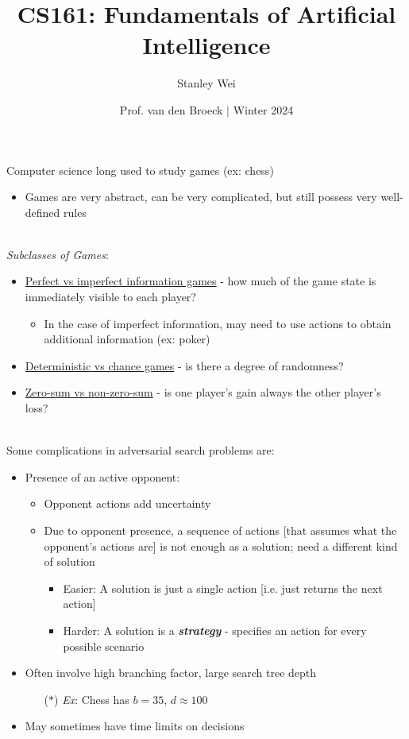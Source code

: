 \documentclass[12pt]{extarticle}
\title{CS161: Fundamentals of Artificial Intelligence}
\author{Stanley Wei}
\date{Prof. van den Broeck $\vert$ Winter 2024}
\theoremstyle{definition}
\theoremstyle{remark}
\newcommand{\pstart}[0]{\noindent}
\newcommand{\newp}[0]{~\\ \pstart}
\newcommand{\term}[1]{\noindent\textbf{\textit{#1}}}
\begin{document}
\pstart
Computer science long used to study games (ex: chess)\begin{itemize}
    \item Games are very abstract, can be very complicated, but still possess very well-defined rules
\end{itemize}

\newp
\textit{Subclasses of Games}: \begin{itemize}
    \item \ul{Perfect vs imperfect information games} - how much of the game state is immediately visible to each player? \begin{itemize}
        \item In the case of imperfect information, may need to use actions to obtain additional information (ex: poker)
    \end{itemize}
    \item \ul{Deterministic vs chance games} - is there a degree of randomness?
    \item \ul{Zero-sum vs non-zero-sum} - is one player's gain always the other player's loss?
\end{itemize}

\newp
Some complications in adversarial search problems are: \begin{itemize}
    \item Presence of an active opponent: \begin{itemize}
        \item Opponent actions add uncertainty
        \item Due to opponent presence, a sequence of actions [that assumes what the opponent's actions are] is not enough as a solution; need a different kind of solution \begin{itemize}
            \item Easier: A solution is just a single action [i.e. just returns the next action]
            \item Harder: A solution is a \term{strategy} - specifies an action for every possible scenario
        \end{itemize}
    \end{itemize}
    \item Often involve high branching factor, large search tree depth \begin{itemize}
        \item[($\ast$)] \textit{Ex}: Chess has $b=35$, $d\approx 100$
    \end{itemize}
    \item May sometimes have time limits on decisions
\end{itemize}
\end{document}
